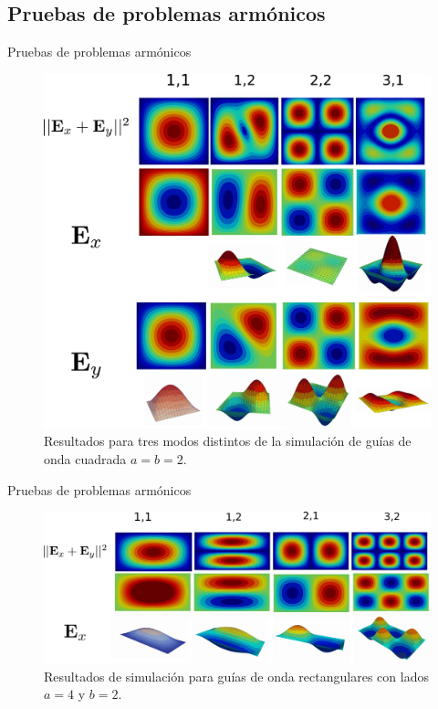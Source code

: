\documentclass[xcolor=table,serif]{beamer}
\begin{document}
	\subsection{Pruebas de problemas armónicos}
	\begin{frame}{Pruebas de problemas armónicos}
		\begin{figure}
		\centering
		\includegraphics[scale=0.07]{square_waveguide.eps}
		\caption{Resultados para tres modos distintos de la simulación de guías de onda cuadrada $a=b=2$.}
		\end{figure}
	\end{frame}
	\begin{frame}{Pruebas de problemas armónicos}
		\begin{figure}
		\centering
		\includegraphics[scale=0.06]{rectangular_waveguide.pdf}
		\caption{Resultados de simulación para guías de onda rectangulares con lados $a=4$ y $b=2$.}
		\label{fig:rectangular_waveguide}
		\end{figure}
	\end{frame}
\end{document}
